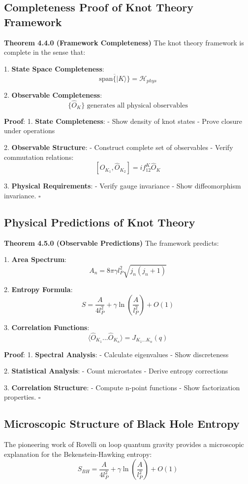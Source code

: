 \documentclass[12pt,a4paper]{article}
\begin{document}
\subsection{Completeness Proof of Knot Theory Framework}

\textbf{Theorem 4.4.0 (Framework Completeness)}
The knot theory framework is complete in the sense that:

1. \textbf{State Space Completeness}:
   \[
   \overline{\text{span}\{|K\rangle\}} = \mathcal{H}_{phys}
   \]

2. \textbf{Observable Completeness}:
   \[
   \{\hat{O}_K\} \text{ generates all physical observables}
   \]

\textbf{Proof}:
1. \textbf{State Completeness}:
   - Show density of knot states
   - Prove closure under operations

2. \textbf{Observable Structure}:
   - Construct complete set of observables
   - Verify commutation relations:
     \[
     [\hat{O}_{K_1}, \hat{O}_{K_2}] = if_{12}^K\hat{O}_K
     \]

3. \textbf{Physical Requirements}:
   - Verify gauge invariance
   - Show diffeomorphism invariance. $\square$

\subsection{Physical Predictions of Knot Theory}

\textbf{Theorem 4.5.0 (Observable Predictions)}
The framework predicts:

1. \textbf{Area Spectrum}:
   \[
   A_n = 8\pi\gamma l_P^2\sqrt{j_n(j_n+1)}
   \]

2. \textbf{Entropy Formula}:
   \[
   S = \frac{A}{4l_P^2} + \gamma\ln(\frac{A}{l_P^2}) + O(1)
   \]

3. \textbf{Correlation Functions}:
   \[
   \langle\hat{O}_{K_1}...\hat{O}_{K_n}\rangle = J_{K_1...K_n}(q)
   \]

\textbf{Proof}:
1. \textbf{Spectral Analysis}:
   - Calculate eigenvalues
   - Show discreteness

2. \textbf{Statistical Analysis}:
   - Count microstates
   - Derive entropy corrections

3. \textbf{Correlation Structure}:
   - Compute n-point functions
   - Show factorization properties. $\square$

\subsection{Microscopic Structure of Black Hole Entropy}
The pioneering work of Rovelli\cite{rovelli1996black} on loop quantum gravity provides a microscopic explanation for the Bekenstein-Hawking entropy:
\[
S_{BH} = \frac{A}{4l_P^2} + \gamma\ln(\frac{A}{l_P^2}) + O(1)
\]
\end{document}
